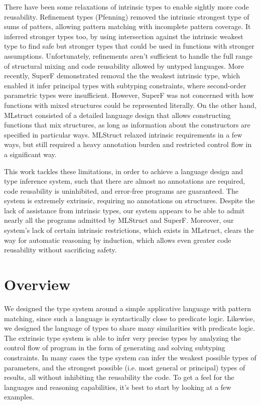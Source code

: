 \documentclass[table,dvipsnames,acmsmall]{acmart}
\theoremstyle{definition}
\begin{document}
There have been some relaxations of intrinsic types to enable sightly more code reusability.
Refinement types (Pfenning) \cite{} removed the intrinsic strongest type of sums of patters,
allowing pattern matching with incomplete pattern coverage. It inferred stronger
types too, by using intersection against the intrinsic weakest type to find safe but stronger types
that could be used in functions with stronger assumptions. 
Unfortunately, refinements aren't sufficient to handle the full range of structural mixing 
and code reusability allowed by untyped languages.
More recently, SuperF \cite{} demonstrated removal the the weakest intrinsic type,
which enabled it infer principal types with subtyping constraints, 
where second-order parametric
types were insufficient. However, SuperF was not concerned with how functions
with mixed structures could be represented literally.
On the other hand, MLstruct \cite{} consisted of a detailed language design that allows
constructing functions that mix structures, as long as information about the constructors
are specified in particular ways. 
MLStruct relaxed intrinsic requirements in a few ways, but still required a heavy annotation
burden and restricted control flow in a significant way.

This work tackles these limitations, in order to achieve a language design and type inference system,
such that there are almost no annotations are required, code reusability is uninhibited, and error-free programs
are guaranteed. The system is extremely extrinsic, requiring no annotations on structures.  
Despite the lack of assistance from intrinsic types, our system appears to be able to admit
nearly all the programs admitted by MLStruct and SuperF.
Moreover, our system's lack of certain intrinsic restrictions, which exists in MLstruct, 
clears the way for automatic reasoning by induction, which allows even greater code reusability
without sacrificing safety.  


\section{Overview}
\label{sec:overview}
We designed the type system around a simple applicative language with pattern matching,
since such a language is syntactically close to predicate logic. Likewise,
we designed the language of types to share many similarities with predicate logic. 
The extrinsic type system is able to infer very precise types by analyzing the control
flow of program in the form of generating and solving subtyping constraints. 
In many cases the type system can infer the weakest possible types of parameters,
and the strongest possible (i.e. most general or principal) types of results,
all without inhibiting the reusability the code.
To get a feel for the languages and reasoning capabilities, it's best to start by
looking at a few examples.
\end{document}
